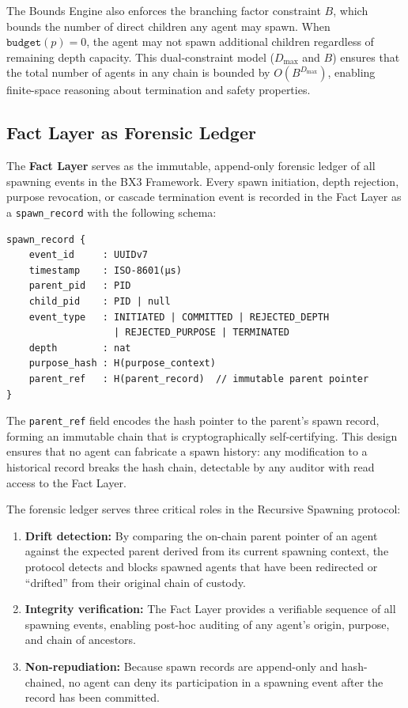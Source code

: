 The Bounds Engine also enforces the branching factor constraint $B$,
which bounds the number of direct children any agent may spawn. When
$\texttt{budget}(p) = 0$, the agent may not spawn additional children
regardless of remaining depth capacity. This dual-constraint model
($D_{\max}$ and $B$) ensures that the total number of agents in any
chain is bounded by $O(B^{D_{\max}})$, enabling finite-space reasoning
about termination and safety properties.

\subsection{Fact Layer as Forensic Ledger}
\label{sec:fact-layer}

The \textbf{Fact Layer} serves as the immutable, append-only forensic
ledger of all spawning events in the BX3 Framework. Every spawn
initiation, depth rejection, purpose revocation, or cascade termination
event is recorded in the Fact Layer as a \texttt{spawn\_record} with the
following schema:

\begin{verbatim}
spawn_record {
    event_id     : UUIDv7
    timestamp    : ISO-8601(μs)
    parent_pid   : PID
    child_pid    : PID | null
    event_type   : INITIATED | COMMITTED | REJECTED_DEPTH
                   | REJECTED_PURPOSE | TERMINATED
    depth        : nat
    purpose_hash : H(purpose_context)
    parent_ref   : H(parent_record)  // immutable parent pointer
}
\end{verbatim}

The \texttt{parent\_ref} field encodes the hash pointer to the parent's
spawn record, forming an immutable chain that is cryptographically
self-certifying. This design ensures that no agent can fabricate a
spawn history: any modification to a historical record breaks the hash
chain, detectable by any auditor with read access to the Fact Layer.

The forensic ledger serves three critical roles in the Recursive
Spawning protocol:

\begin{enumerate}
  \item \textbf{Drift detection:} By comparing the on-chain parent
        pointer of an agent against the expected parent derived from its
        current spawning context, the protocol detects and blocks
        spawned agents that have been redirected or ``drifted'' from
        their original chain of custody.
  \item \textbf{Integrity verification:} The Fact Layer provides a
        verifiable sequence of all spawning events, enabling post-hoc
        auditing of any agent's origin, purpose, and chain of ancestors.
  \item \textbf{Non-repudiation:} Because spawn records are
        append-only and hash-chained, no agent can deny its participation
        in a spawning event after the record has been committed.
\end{enumerate}

